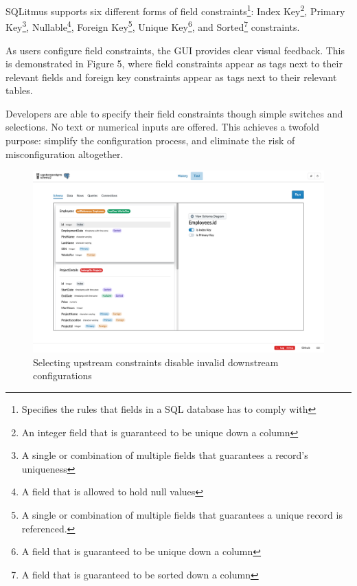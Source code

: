 \documentclass[12pt]{report}
\begin{document}
\begin{spacing}{1.9}
\begin{figure}[H]
		\end{figure}
		
		SQLitmus supports six different forms of field constraints\footnote{Specifies the rules that fields in a SQL database has to comply with}: Index Key\footnote{An integer field that is guaranteed to be unique down a column}, Primary Key\footnote{A single or combination of multiple fields that guarantees a record's uniqueness}, Nullable\footnote{A field that is allowed to hold null values}, Foreign Key\footnote{A single or combination of multiple fields that guarantees a unique record is referenced.}, Unique Key\footnote{A field that is guaranteed to be unique down a column}, and Sorted\footnote{A field that is guaranteed to be sorted down a column} constraints.
		
		As users configure field constraints, the GUI provides clear visual feedback. This is demonstrated in Figure 5, where field constraints appear as tags next to their relevant fields and foreign key constraints appear as tags next to their relevant tables.
		
		Developers are able to specify their field constraints though simple switches and selections. No text or numerical inputs are offered. This achieves a twofold purpose: simplify the configuration process, and eliminate the risk of misconfiguration altogether. 
		
		
		
		
		\begin{figure}[H]
			\centering
			\includegraphics[width=\textwidth]{3-2-1b.png}
			\caption{Selecting upstream constraints disable invalid downstream configurations}
			
		\end{figure}
		

\end{spacing}
\end{document}
